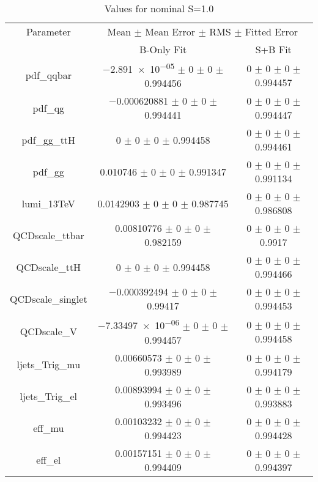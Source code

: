 \begin{table}
\centering
\caption{Values for nominal S=1.0}
\begin{tabular}{ccc}
\toprule
Parameter 	& \multicolumn{2}{c}{Mean $\pm$ Mean Error $\pm$ RMS $\pm$ Fitted Error}\\
 	& B-Only Fit & S+B Fit\\
\midrule
pdf\_qqbar 	& \num{-2.891e-05} $\pm$ \num{0} $\pm$ \num{0} $\pm$ \num{0.994456} 	& \num{0} $\pm$ \num{0} $\pm$ \num{0} $\pm$ \num{0.994457}\\
pdf\_qg 	& \num{-0.000620881} $\pm$ \num{0} $\pm$ \num{0} $\pm$ \num{0.994441} 	& \num{0} $\pm$ \num{0} $\pm$ \num{0} $\pm$ \num{0.994447}\\
pdf\_gg\_ttH 	& \num{0} $\pm$ \num{0} $\pm$ \num{0} $\pm$ \num{0.994458} 	& \num{0} $\pm$ \num{0} $\pm$ \num{0} $\pm$ \num{0.994461}\\
pdf\_gg 	& \num{0.010746} $\pm$ \num{0} $\pm$ \num{0} $\pm$ \num{0.991347} 	& \num{0} $\pm$ \num{0} $\pm$ \num{0} $\pm$ \num{0.991134}\\
lumi\_13TeV 	& \num{0.0142903} $\pm$ \num{0} $\pm$ \num{0} $\pm$ \num{0.987745} 	& \num{0} $\pm$ \num{0} $\pm$ \num{0} $\pm$ \num{0.986808}\\
QCDscale\_ttbar 	& \num{0.00810776} $\pm$ \num{0} $\pm$ \num{0} $\pm$ \num{0.982159} 	& \num{0} $\pm$ \num{0} $\pm$ \num{0} $\pm$ \num{0.9917}\\
QCDscale\_ttH 	& \num{0} $\pm$ \num{0} $\pm$ \num{0} $\pm$ \num{0.994458} 	& \num{0} $\pm$ \num{0} $\pm$ \num{0} $\pm$ \num{0.994466}\\
QCDscale\_singlet 	& \num{-0.000392494} $\pm$ \num{0} $\pm$ \num{0} $\pm$ \num{0.99417} 	& \num{0} $\pm$ \num{0} $\pm$ \num{0} $\pm$ \num{0.994453}\\
QCDscale\_V 	& \num{-7.33497e-06} $\pm$ \num{0} $\pm$ \num{0} $\pm$ \num{0.994457} 	& \num{0} $\pm$ \num{0} $\pm$ \num{0} $\pm$ \num{0.994458}\\
ljets\_Trig\_mu 	& \num{0.00660573} $\pm$ \num{0} $\pm$ \num{0} $\pm$ \num{0.993989} 	& \num{0} $\pm$ \num{0} $\pm$ \num{0} $\pm$ \num{0.994179}\\
ljets\_Trig\_el 	& \num{0.00893994} $\pm$ \num{0} $\pm$ \num{0} $\pm$ \num{0.993496} 	& \num{0} $\pm$ \num{0} $\pm$ \num{0} $\pm$ \num{0.993883}\\
eff\_mu 	& \num{0.00103232} $\pm$ \num{0} $\pm$ \num{0} $\pm$ \num{0.994423} 	& \num{0} $\pm$ \num{0} $\pm$ \num{0} $\pm$ \num{0.994428}\\
eff\_el 	& \num{0.00157151} $\pm$ \num{0} $\pm$ \num{0} $\pm$ \num{0.994409} 	& \num{0} $\pm$ \num{0} $\pm$ \num{0} $\pm$ \num{0.994397}\\

\end{tabular}
\end{table}
